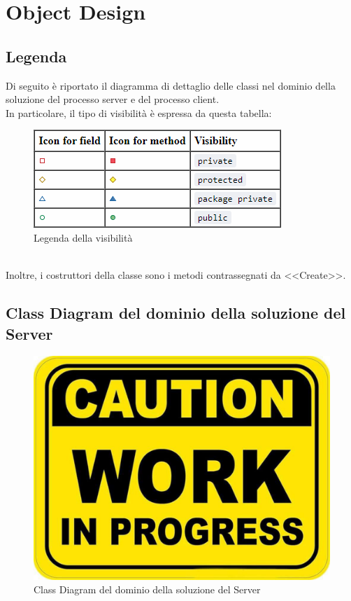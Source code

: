 \chapter{Object Design}
    \section{Legenda}
        Di seguito è riportato il diagramma di dettaglio delle classi nel dominio della soluzione del processo server e del processo client.\\
        In particolare, il tipo di visibilità è espressa da questa tabella:
        \begin{figure}[htbp!]
            \centering
            \includegraphics[width=0.25\linewidth]{Immagini/Legend visibility.png}
            \caption{Legenda della visibilità}
            \label{fig:Legenda della visibilità}
        \end{figure}\\
        Inoltre, i costruttori della classe sono i metodi contrassegnati da \textless{}\textless{}Create\textgreater{}\textgreater{}.

    \section{Class Diagram del dominio della soluzione del Server}
        \begin{figure}[htbp!]
            \centering
                \vspace{2\baselineskip}
                \includegraphics[width=\linewidth]{Immagini/WorkInProgress.pdf}
            \caption{Class Diagram del dominio della soluzione del Server}
            \label{fig:Class Diagram del dominio della soluzione del Server}
        \end{figure}

